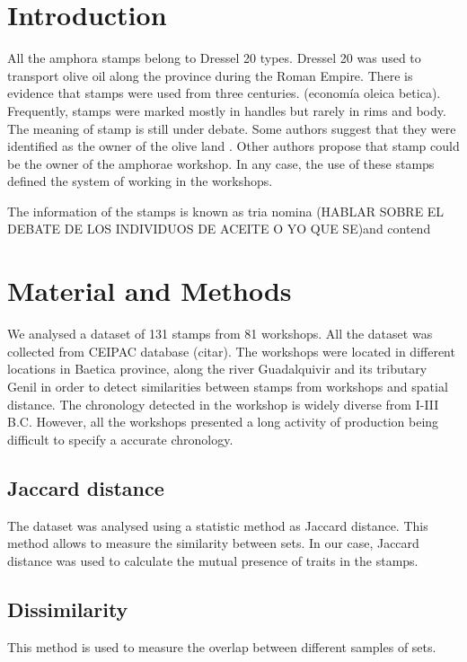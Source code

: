 \documentclass[review]{elsarticle}
\begin{document}
\section{Introduction}


All the amphora stamps belong to Dressel 20 types. Dressel 20 was used to transport olive oil along the province during the Roman Empire. There is evidence that stamps were used from three centuries. (economía oleica betica). Frequently, stamps were marked mostly in handles but rarely in rims and body.  
The meaning of stamp is still under debate. Some authors suggest that they were identified as the owner of the olive land \citep{rodriguez_economioleicola_1977}. Other authors propose that stamp could be the owner of the amphorae workshop. In any case, the use of these stamps defined the system of working in the workshops. 



The information of the stamps is known as tria nomina (HABLAR SOBRE EL DEBATE DE LOS INDIVIDUOS DE ACEITE O YO QUE SE)and contend 


\section{Material and Methods}

We analysed a dataset of 131 stamps from 81 workshops. All the dataset was collected from CEIPAC database (citar). The workshops were located in different locations in Baetica province, along the river Guadalquivir and its tributary Genil in order to detect similarities between stamps from workshops and spatial distance. The chronology detected in the workshop is widely diverse from I-III B.C. However, all the workshops presented a long activity of production being difficult to specify a accurate chronology. 

 







\subsection{Jaccard distance}

The dataset was analysed using a statistic method as Jaccard distance. This method allows to measure the similarity between sets. In our case, Jaccard distance was used to calculate the mutual presence of traits in the stamps.    



\subsection{Dissimilarity}

This method is used to measure the overlap between different samples of sets. 


\end{document}
